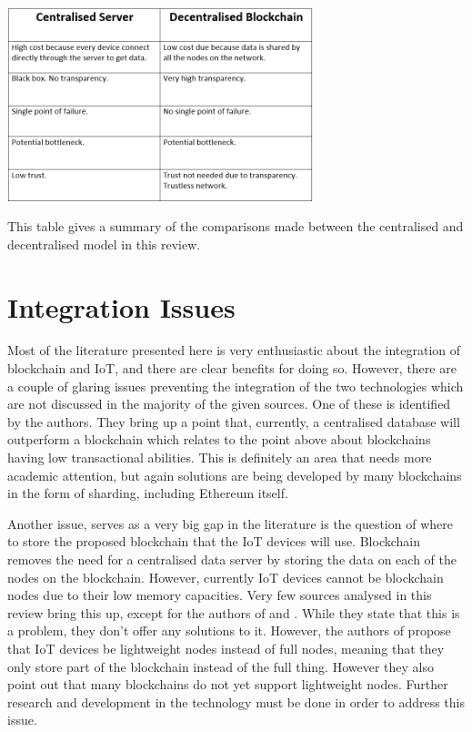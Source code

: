 \documentclass[transmag]{IEEEtran}
\begin{document}
\centerline{
    \includegraphics[width=3.5in]{table.png}
}
This table gives a summary of the comparisons made between the centralised and decentralised model in this review. 

\section{Integration Issues}
Most of the literature presented here is very enthusiastic about the integration of blockchain and IoT, and there are clear benefits for doing so. However, there are a couple of glaring issues preventing the integration of the two technologies which are not discussed in the majority of the given sources. One of these is identified by the authors\cite{ref9}. They bring up a point that, currently, a centralised database will outperform a blockchain which relates to the point above about blockchains having low transactional abilities. This is definitely an area that needs more academic attention, but again solutions are being developed by many blockchains in the form of sharding, including Ethereum itself.
\par Another issue, serves as a very big gap in the literature is the question of where to store the proposed blockchain that the IoT devices will use. Blockchain removes the need for a centralised data server by storing the data on each of the nodes on the blockchain. However, currently IoT devices cannot be blockchain nodes due to their low memory capacities. Very few sources analysed in this review bring this up, except for the authors of \cite{where} and \cite{ref6}. While they state that this is a problem, they don't offer any solutions to it. However, the authors of \cite{ref7} propose that IoT devices be lightweight nodes instead of full nodes, meaning that they only store part of the blockchain instead of the full thing. However they also point out that many blockchains do not yet support lightweight nodes. Further research and development in the technology must be done in order to address this issue.
\end{document}
